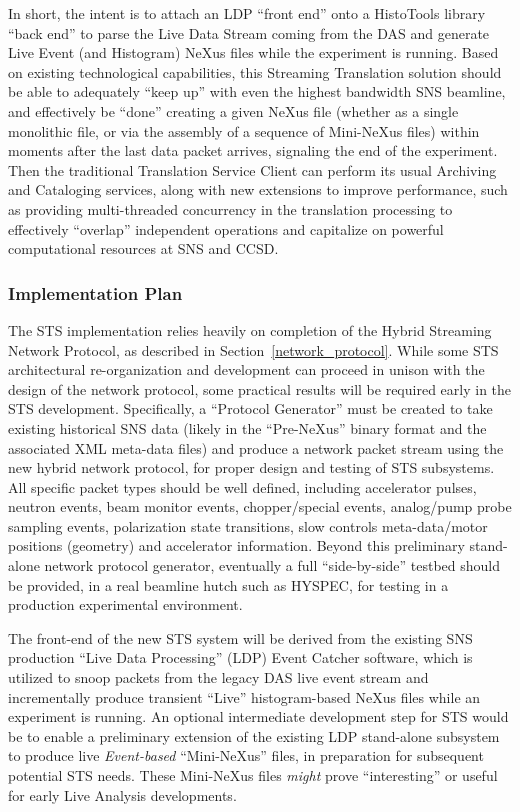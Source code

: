 In short, the intent is to attach an LDP ``front end'' onto a HistoTools
library ``back end'' to parse the Live Data Stream coming from the DAS and
generate Live Event (and Histogram) NeXus files while the experiment is
running. Based on existing technological capabilities, this Streaming
Translation solution should be able to adequately ``keep up'' with even the
highest bandwidth SNS beamline, and effectively be ``done'' creating a given
NeXus file (whether as a single monolithic file, or via the assembly of a
sequence of Mini-NeXus files) within moments after the last data packet
arrives, signaling the end of the experiment. Then the traditional Translation
Service Client can perform its usual Archiving and Cataloging services, along
with new extensions to improve performance, such as providing multi-threaded
concurrency in the translation processing to effectively ``overlap'' independent
operations and capitalize on powerful computational resources at SNS and
CCSD.

\subsubsection{Implementation Plan}

The STS implementation relies heavily on completion of the
Hybrid Streaming Network Protocol,
as described in Section~\ref{network_protocol}.
While some STS architectural re-organization and development can proceed
in unison with the design of the network protocol,
some practical results will be required early in the STS development.
Specifically, a ``Protocol Generator'' must be created to take existing
historical SNS data (likely in the ``Pre-NeXus'' binary format and the
associated XML meta-data files) and produce a network packet stream
using the new hybrid network protocol,
for proper design and testing of STS subsystems.
All specific packet types should be well defined,
including accelerator pulses, neutron events, beam monitor events,
chopper/special events, analog/pump probe sampling events,
polarization state transitions, slow controls meta-data/motor positions
(geometry) and accelerator information.
Beyond this preliminary stand-alone network protocol generator,
eventually a full ``side-by-side'' testbed should be provided,
in a real beamline hutch such as HYSPEC,
for testing in a production experimental environment.

The front-end of the new STS system will be derived from the
existing SNS production ``Live Data Processing'' (LDP)
Event Catcher software,
which is utilized to snoop packets from the legacy DAS live event stream
and incrementally produce transient ``Live'' histogram-based NeXus files
while an experiment is running.
An optional intermediate development step for STS would be to enable a
preliminary extension of the existing LDP stand-alone subsystem to produce
live {\em Event-based} ``Mini-NeXus'' files,
in preparation for subsequent potential STS needs.
These Mini-NeXus files {\em might} prove ``interesting'' or useful
for early Live Analysis developments.

